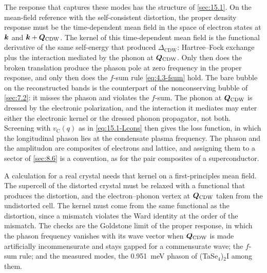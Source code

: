 The response that captures these modes has the structure of \cref{sec:15.1}. On the mean-field reference with the self-consistent distortion, the proper density response must be the time-dependent mean field in the space of electron states at $\bm{k}$ and $\bm{k} + \bm{Q}_{\mathrm{CDW}}$. The kernel of this time-dependent mean field is the functional derivative of the same self-energy that produced $\Delta_{\mathrm{CDW}}$: Hartree--Fock exchange plus the interaction mediated by the phonon at $\bm{Q}_{\mathrm{CDW}}$. Only then does the broken translation produce the phason pole at zero frequency in the proper response, and only then does the $f$-sum rule \cref{eq:4.3-fsum} hold. The bare bubble on the reconstructed bands is the counterpart of the nonconserving bubble of \cref{sec:7.2}: it misses the phason and violates the $f$-sum. The phonon at $\bm{Q}_{\mathrm{CDW}}$ is dressed by the electronic polarization, and the interaction it mediates may enter either the electronic kernel or the dressed phonon propagator, not both. Screening with $v_{\mathrm{C}}(q)$ as in \cref{eq:15.1-Lcons} then gives the loss function, in which the longitudinal phason lies at the condensate plasma frequency. The phason and the amplitudon are composites of electrons and lattice, and assigning them to a sector of \cref{sec:8.6} is a convention, as for the pair composites of a superconductor.

A calculation for a real crystal needs that kernel on a first-principles mean field. The supercell of the distorted crystal must be relaxed with a functional that produces the distortion, and the electron--phonon vertex at $\bm{Q}_{\mathrm{CDW}}$ taken from the undistorted cell. The kernel must come from the same functional as the distortion, since a mismatch violates the Ward identity at the order of the mismatch. The checks are the Goldstone limit of the proper response, in which the phason frequency vanishes with its wave vector when $\bm{Q}_{\mathrm{CDW}}$ is made artificially incommensurate and stays gapped for a commensurate wave; the $f$-sum rule; and the measured modes, the \SI{0.951}{meV} phason of (TaSe$_4$)$_2$I among them.
